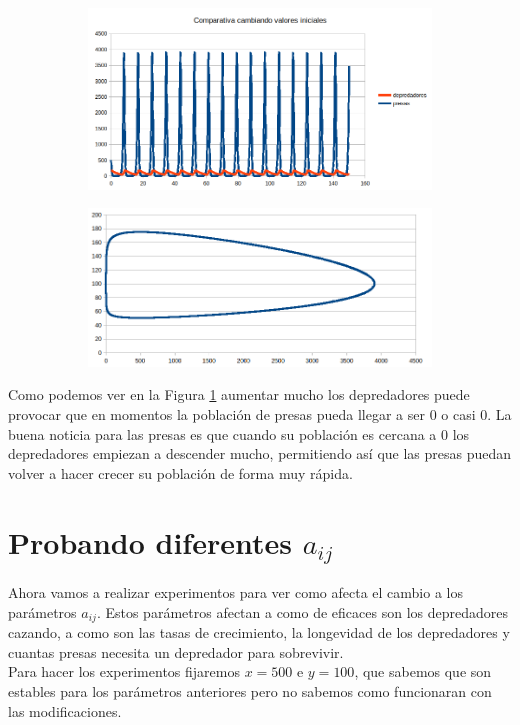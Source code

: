 \documentclass[12pt,a4paper]{article}
\begin{document}
\begin{figure}[H]
	\centering
	\begin{subfigure}{.5\textwidth}
		\centering
	\includegraphics[width=1\linewidth]{images/ejercicio2_4}
		\caption{}
	\label{fig:ejercicio241}
	\end{subfigure}%
	\begin{subfigure}{.5\textwidth}
		\centering
	\includegraphics[width=1\linewidth]{images/ejercicio2_4_2}
		\caption{}
	\label{fig:ejercicio242}
	\end{subfigure}

	\label{fig:ejercicio24}
\end{figure}
Como podemos ver en la Figura \ref{fig:ejercicio241} aumentar mucho los depredadores puede provocar que en momentos la población de presas pueda llegar a ser 0 o casi 0. La buena noticia para las presas es que cuando su población es cercana a 0 los depredadores empiezan a descender mucho, permitiendo así que las presas puedan volver a hacer crecer su población de forma muy rápida. 

\section{Probando diferentes $a_{ij}$}
Ahora vamos a realizar experimentos para ver como afecta el cambio a los parámetros $a_{ij}$. Estos parámetros afectan a como de eficaces son los depredadores cazando, a como son las tasas de crecimiento, la longevidad de los depredadores  y cuantas presas necesita un depredador para sobrevivir. \\
Para hacer los experimentos fijaremos $x=500$ e $ y=100$, que sabemos que son estables para los parámetros anteriores pero no sabemos como funcionaran con las modificaciones. 
\end{document}
